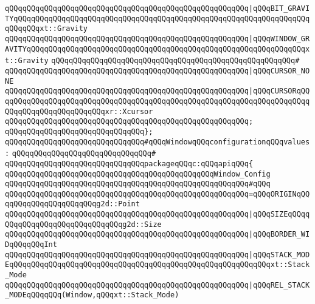\verb|qQQqqQQqqQQqqQQqqQQqqQQqqQQqqQQqqQQqqQQqqQQqqQQqqQQqqQQq|\verb#|qQQqBIT_GRAVITYqQQqqQQqqQQqqQQqqQQqqQQqqQQqqQQqqQQqqQQqqQQqqQQqqQQqqQQqqQQqqQQqqQQqqQQqqQQqxt::Gravity#\newline
\verb|qQQqqQQqqQQqqQQqqQQqqQQqqQQqqQQqqQQqqQQqqQQqqQQqqQQqqQQq|\verb#|qQQqWINDOW_GRAVITYqQQqqQQqqQQqqQQqqQQqqQQqqQQqqQQqqQQqqQQqqQQqqQQqqQQqqQQqqQQqqQQqxt::Gravity#\newline
\verb|qQQqqQQqqQQqqQQqqQQqqQQqqQQqqQQqqQQqqQQqqQQqqQQqqQQqqQQq#|\newline
\verb|qQQqqQQqqQQqqQQqqQQqqQQqqQQqqQQqqQQqqQQqqQQqqQQqqQQqqQQq|\verb#|qQQqCURSOR_NONE#\newline
\verb|qQQqqQQqqQQqqQQqqQQqqQQqqQQqqQQqqQQqqQQqqQQqqQQqqQQqqQQq|\verb#|qQQqCURSORqQQqqQQqqQQqqQQqqQQqqQQqqQQqqQQqqQQqqQQqqQQqqQQqqQQqqQQqqQQqqQQqqQQqqQQqqQQqqQQqqQQqqQQqqQQqqQQqxr::Xcursor#\newline
\verb|qQQqqQQqqQQqqQQqqQQqqQQqqQQqqQQqqQQqqQQqqQQqqQQqqQQqqQQq;|\newline
\verb|qQQqqQQqqQQqqQQqqQQqqQQqqQQqqQQq};|\newline
\newline
\verb|qQQqqQQqqQQqqQQqqQQqqQQqqQQqqQQq#qQQqWindowqQQqconfigurationqQQqvalues:|\newline
\verb|qQQqqQQqqQQqqQQqqQQqqQQqqQQqqQQq#|\newline
\verb|qQQqqQQqqQQqqQQqqQQqqQQqqQQqqQQqpackageqQQqc:qQQqapiqQQq{|\newline
\newline
\verb|qQQqqQQqqQQqqQQqqQQqqQQqqQQqqQQqqQQqqQQqqQQqqQQqWindow_Config|\newline
\verb|qQQqqQQqqQQqqQQqqQQqqQQqqQQqqQQqqQQqqQQqqQQqqQQqqQQqqQQq#qQQq|\newline
\verb|qQQqqQQqqQQqqQQqqQQqqQQqqQQqqQQqqQQqqQQqqQQqqQQqqQQqqQQq=qQQqORIGINqQQqqQQqqQQqqQQqqQQqqQQqg2d::Point|\newline
\verb|qQQqqQQqqQQqqQQqqQQqqQQqqQQqqQQqqQQqqQQqqQQqqQQqqQQqqQQq|\verb#|qQQqSIZEqQQqqQQqqQQqqQQqqQQqqQQqqQQqqQQqg2d::Size#\newline
\verb|qQQqqQQqqQQqqQQqqQQqqQQqqQQqqQQqqQQqqQQqqQQqqQQqqQQqqQQq|\verb#|qQQqBORDER_WIDqQQqqQQqInt#\newline
\verb|qQQqqQQqqQQqqQQqqQQqqQQqqQQqqQQqqQQqqQQqqQQqqQQqqQQqqQQq|\verb#|qQQqSTACK_MODEqQQqqQQqqQQqqQQqqQQqqQQqqQQqqQQqqQQqqQQqqQQqqQQqqQQqqQQqqQQqxt::Stack_Mode#\newline
\verb|qQQqqQQqqQQqqQQqqQQqqQQqqQQqqQQqqQQqqQQqqQQqqQQqqQQqqQQq|\verb#|qQQqREL_STACK_MODEqQQqqQQq(Window,qQQqxt::Stack_Mode)#\newline
